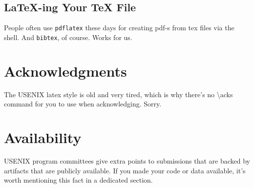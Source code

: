 \subsection{LaTeX-ing Your TeX File}

People often use \texttt{pdflatex} these days for creating pdf-s from
tex files via the shell. And \texttt{bibtex}, of course. Works for us.

\section*{Acknowledgments}

The USENIX latex style is old and very tired, which is why
there's no \textbackslash{}acks command for you to use when
acknowledging. Sorry.

\section*{Availability}

USENIX program committees give extra points to submissions that are
backed by artifacts that are publicly available. If you made your code
or data available, it's worth mentioning this fact in a dedicated
section.






